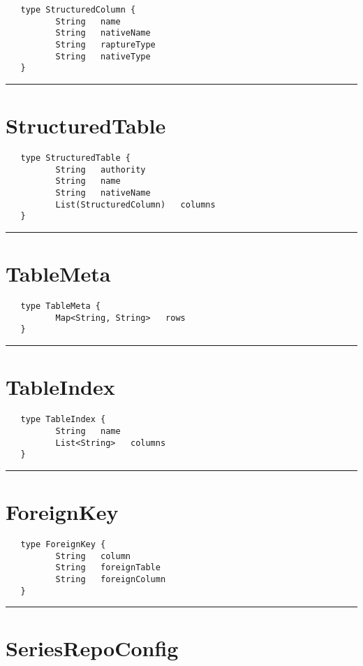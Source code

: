 \begin{verbatim}
   type StructuredColumn {
          String   name
          String   nativeName
          String   raptureType
          String   nativeType
   }
\end{verbatim}

\rule{15cm}{2pt}
\section{StructuredTable}
\label{type:StructuredTable}

\begin{verbatim}
   type StructuredTable {
          String   authority
          String   name
          String   nativeName
          List(StructuredColumn)   columns
   }
\end{verbatim}

\rule{15cm}{2pt}
\section{TableMeta}
\label{type:TableMeta}

\begin{verbatim}
   type TableMeta {
          Map<String, String>   rows
   }
\end{verbatim}

\rule{15cm}{2pt}
\section{TableIndex}
\label{type:TableIndex}

\begin{verbatim}
   type TableIndex {
          String   name
          List<String>   columns
   }
\end{verbatim}

\rule{15cm}{2pt}
\section{ForeignKey}
\label{type:ForeignKey}

\begin{verbatim}
   type ForeignKey {
          String   column
          String   foreignTable
          String   foreignColumn
   }
\end{verbatim}

\rule{15cm}{2pt}
\section{SeriesRepoConfig}
\label{type:SeriesRepoConfig}

